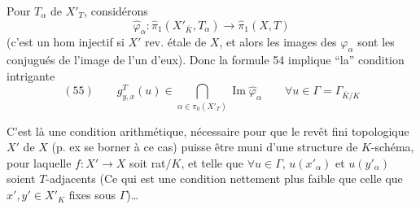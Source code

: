 Pour   $T_\alpha$ de $X'_T$, considérons
\[
\widehat\varphi_\alpha:\widehat\pi_1(X'_{\overline K},T_\alpha)\longrightarrow\widehat\pi_1(X,T)
\]
(c'est un hom injectif si $X'$ rev. étale de $X$, et alors les  images des $\varphi_\alpha$ sont les conjugués de l'image de l'un d'eux). Donc  la formule 54 implique ``la'' condition intrigante
\[
(55)\qquad g^T_{y,x}(u)\in\bigcap_{\alpha\in\pi_0(X'_T)}\operatorname{Im}\widehat\varphi_\alpha
\qquad\forall u\in\Gamma=\Gamma_{\overline K/K}
\]

C'est là une condition arithmétique, nécessaire pour que le revêt  fini topologique $X'$ de $X$ (p. ex se borner à ce cas) puisse  être muni d'une  structure de $K$-schéma, pour laquelle $f:X'\to X$ soit rat$ /K$, et telle que  $\forall u\in\Gamma$, $u(x'_\alpha)$ et $u(y'_\alpha)$ soient $T$-adjacents (Ce qui est une condition nettement plus faible que celle que $x',y'\in X'_K$ \deleted{)}  fixes sous $\Gamma$)\ldots
{}
